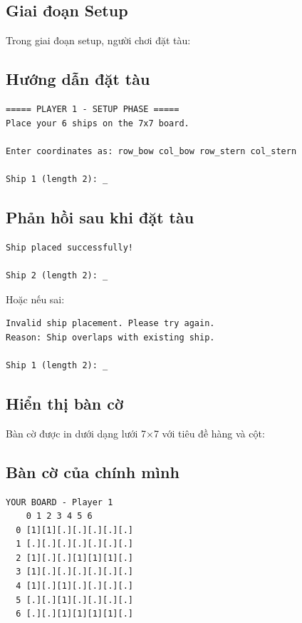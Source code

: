 \subsection{Giai đoạn Setup}

Trong giai đoạn setup, người chơi đặt tàu:

\subsection{Hướng dẫn đặt tàu}

\begin{verbatim}
===== PLAYER 1 - SETUP PHASE =====
Place your 6 ships on the 7x7 board.

Enter coordinates as: row_bow col_bow row_stern col_stern

Ship 1 (length 2): _
\end{verbatim}

\subsection{Phản hồi sau khi đặt tàu}

\begin{verbatim}
Ship placed successfully!

Ship 2 (length 2): _
\end{verbatim}

Hoặc nếu sai:

\begin{verbatim}
Invalid ship placement. Please try again.
Reason: Ship overlaps with existing ship.

Ship 1 (length 2): _
\end{verbatim}

\subsection{Hiển thị bàn cờ}

Bàn cờ được in dưới dạng lưới 7×7 với tiêu đề hàng và cột:

\subsection{Bàn cờ của chính mình}

\begin{verbatim}
YOUR BOARD - Player 1
    0 1 2 3 4 5 6
  0 [1][1][.][.][.][.][.]
  1 [.][.][.][.][.][.][.]
  2 [1][.][.][1][1][1][.]
  3 [1][.][.][.][.][.][.]
  4 [1][.][1][.][.][.][.]
  5 [.][.][1][.][.][.][.]
  6 [.][.][1][1][1][1][.]
\end{verbatim}

